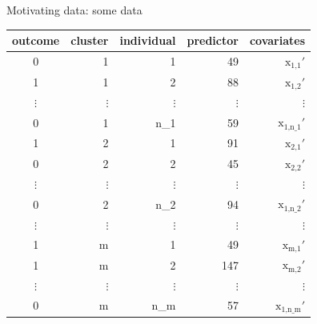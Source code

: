 \documentclass{beamer}
\newenvironment{datasec}{\footnotesize\ttfamily}{\par}
\begin{document}
\begin{frame}{Motivating data: some data}


\newcommand{\rowdots}{  $\vdots$ & $\vdots$  & $\vdots$  & $\vdots$  & $\vdots$  \\}

\centering\footnotesize
\begin{datasec}
\begin{tabular}{crrrr} 
  \hline
\rowcolor{lghtGrey}
outcome & cluster & individual & predictor & covariates\\ 
  \hline
0 & 1 & 1 & 49 & $\text{x}_{\text{1,1}}'$ \\ 
  1 & 1 & 2 & 88 &  $\text{x}_{\text{1,2}}'$\\ 
\rowdots
  0 & 1 & n\_1 & 59 & $\text{x}_{\text{1,n\_1}}'$ \\ 
\rowcolor{lghtGrey}
  1 & 2 & 1 & 91 &  $\text{x}_{\text{2,1}}'$ \\ 
\rowcolor{lghtGrey}
  0 & 2 & 2 & 45 &   $\text{x}_{\text{2,2}}'$ \\ 
\rowcolor{lghtGrey}
\rowdots
\rowcolor{lghtGrey}
  0 & 2 & n\_2 & 94 &  $\text{x}_{\text{1,n\_2}}'$  \\ 
\rowdots
\rowcolor{lghtGrey}
  1 & m & 1 & 49 &  $\text{x}_{\text{m,1}}'$ \\ 
\rowcolor{lghtGrey}
  1 & m & 2 & 147 &  $\text{x}_{\text{m,2}}'$ \\ 
\rowcolor{lghtGrey}
\rowdots
\rowcolor{lghtGrey}
  0 & m & n\_m & 57 &  $\text{x}_{\text{1,n\_m}}'$  \\ 
   \hline
\end{tabular}
\end{datasec}





\end{frame}


\end{document}
